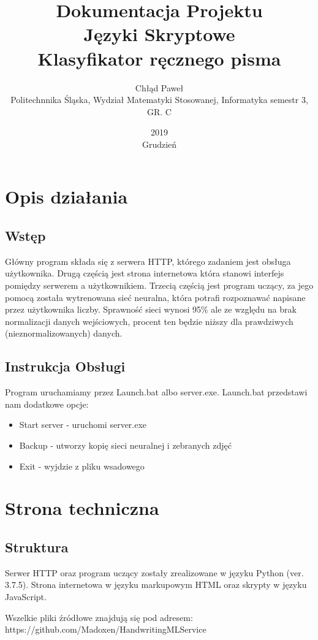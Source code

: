 \documentclass{article}
\title{Dokumentacja Projektu \\ Języki Skryptowe \\ Klasyfikator ręcznego pisma}
\author{Chłąd Paweł \\ Politechnnika Śląska, Wydział Matematyki Stosowanej, Informatyka semestr 3, GR. C}
\date{2019 \\ Grudzień}
\begin{document}
\maketitle
\pagebreak
\section{Opis działania}

\subsection{Wstęp}
Główny program składa się z serwera HTTP, którego
zadaniem jest obsługa użytkownika. Drugą częścią jest 
strona internetowa która stanowi interfejs pomiędzy serwerem
a użytkownikiem. Trzecią częścią jest program uczący, za jego
pomocą została wytrenowana sieć neuralna, która potrafi rozpoznawać
napisane przez użytkownika liczby. Sprawność sieci wynosi 95\% ale 
ze względu na brak normalizacji danych wejściowych, procent ten będzie niższy
dla prawdziwych (nieznormalizowanych) danych. 

\subsection{Instrukcja Obsługi}

Program uruchamiamy przez Launch.bat albo server.exe. Launch.bat przedstawi nam dodatkowe opcje:
\begin{itemize}
    \item Start server - uruchomi server.exe
    \item Backup - utworzy kopię sieci neuralnej i zebranych zdjęć
    \item Exit - wyjdzie z pliku wsadowego
\end{itemize}




\section{Strona techniczna}
\subsection{Struktura}
Serwer HTTP oraz program uczący zostały zrealizowane w języku Python (ver. 3.7.5).
Strona internetowa w języku markupowym HTML oraz skrypty w języku JavaScript.

Wszelkie pliki źródłowe znajdują się pod adresem: https://github.com/Madoxen/HandwritingMLService
\end{document}
